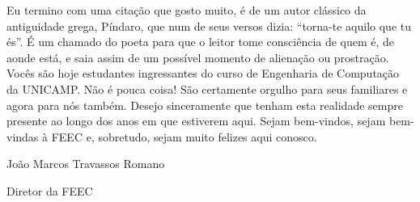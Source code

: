 Eu termino com uma citação que gosto muito, é de um autor clássico da
antiguidade grega, Píndaro, que num de seus versos dizia: ``torna-te aquilo que
tu és''. É um chamado do poeta para que o leitor tome consciência de quem é, de
aonde está, e saia assim de um possível momento de alienação ou prostração.
Vocês são hoje estudantes ingressantes do curso de Engenharia de Computação da
UNICAMP. Não é pouca coisa! São certamente orgulho para seus familiares e agora
para nós também. Desejo sinceramente que tenham esta realidade sempre presente
ao longo dos anos em que estiverem aqui. Sejam bem-vindos, sejam bem-vindas à
FEEC e, sobretudo, sejam muito felizes aqui conosco.\\

\begin{flushright}
João Marcos Travassos Romano

Diretor da FEEC
\end{flushright}
